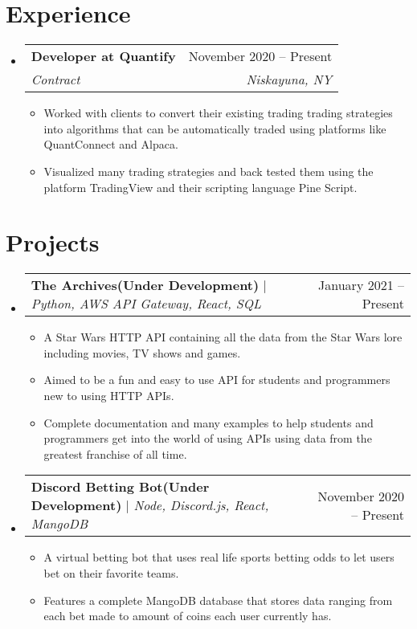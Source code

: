 \documentclass[letterpaper,11pt]{article}
\makeatletter
\newcommand{\resumeItem}[1]{
  \item\small{
    {#1 \vspace{-2pt}}
  }
}
\newcommand{\resumeSubheading}[4]{
  \vspace{-2pt}\item
    \begin{tabular*}{0.97\textwidth}[t]{l@{\extracolsep{\fill}}r}
      \textbf{#1} & #2 \\
      \textit{\small#3} & \textit{\small #4} \\
    \end{tabular*}\vspace{-7pt}
}
\newcommand{\resumeSubSubheading}[2]{
    \item
    \begin{tabular*}{0.97\textwidth}{l@{\extracolsep{\fill}}r}
      \textit{\small#1} & \textit{\small #2} \\
    \end{tabular*}\vspace{-7pt}
}
\newcommand{\resumeProjectHeading}[2]{
    \item
    \begin{tabular*}{0.97\textwidth}{l@{\extracolsep{\fill}}r}
      \small#1 & #2 \\
    \end{tabular*}\vspace{-7pt}
}
\newcommand{\resumeSubHeadingListStart}{\begin{itemize}[leftmargin=0.15in, label={}]}
\newcommand{\resumeSubHeadingListEnd}{\end{itemize}}
\newcommand{\resumeItemListStart}{\begin{itemize}}
\newcommand{\resumeItemListEnd}{\end{itemize}\vspace{-5pt}}
\makeatother
\begin{document}
\section{Experience}
  \resumeSubHeadingListStart

    \resumeSubheading
      {Developer at Quantify }{November 2020 -- Present}
      {Contract}{Niskayuna, NY}
      \resumeItemListStart
        \resumeItem{Worked with clients to convert their existing trading trading strategies into algorithms that can be automatically traded using platforms like QuantConnect and Alpaca.}
        \resumeItem{Visualized many trading strategies and back tested them using the platform TradingView and their scripting language Pine Script.}
      \resumeItemListEnd
      

  \resumeSubHeadingListEnd


\section{Projects}
    \resumeSubHeadingListStart
      \resumeProjectHeading
          {\textbf{The Archives(Under Development)} $|$ \emph{Python, AWS API Gateway, React, SQL}}{January 2021 -- Present}
          \resumeItemListStart
            \resumeItem{A Star Wars HTTP API containing all the data from the Star Wars lore including movies, TV shows and games.}
            \resumeItem{Aimed to be a fun and easy to use API for students and programmers new to using HTTP APIs.}
            \resumeItem{Complete documentation and many examples to help students and programmers get into the world of using APIs using data from the greatest franchise of all time.}
          \resumeItemListEnd
      \resumeProjectHeading
          {\textbf{Discord Betting Bot(Under Development)} $|$ \emph{Node, Discord.js, React, MangoDB}}{November 2020 -- Present}
          \resumeItemListStart
            \resumeItem{A virtual betting bot that uses real life sports betting odds to let users bet on their favorite teams.}
            \resumeItem{Features a complete MangoDB database that stores data ranging from each bet made to amount of coins each user currently has.}
          \resumeItemListEnd
    \resumeSubHeadingListEnd
\end{document}
